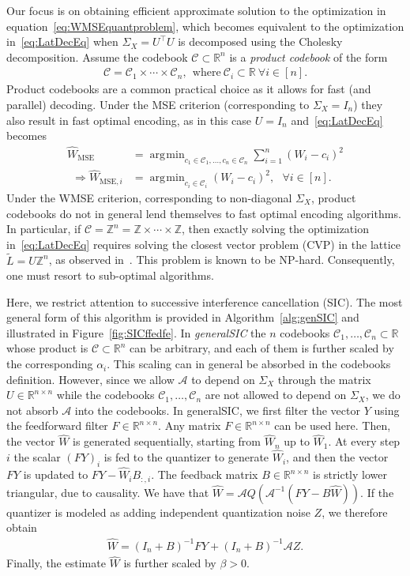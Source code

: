 \documentclass[journal]{IEEEtran}
\newcommand{\ZZ}{\mathbb{Z}}
\newcommand{\RR}{\mathbb{R}}
\newcommand{\m}{\mathcal}
\DeclareMathOperator*{\argmin}{\arg\!\min}
\begin{document}
Our focus is on obtaining efficient approximate solution to the optimization in equation~\eqref{eq:WMSEquantproblem}, which becomes equivalent to the optimization in~\eqref{eq:LatDecEq} when $\Sigma_X=U^\top U$ is decomposed using the Cholesky decomposition. Assume the codebook $\m{C}\subset\RR^n$ is a \emph{product codebook} of the form 
\begin{align}
\m{C}=\m{C}_1\times\cdots\times\m{C}_n,~~\text{where}~\m{C}_i\subset\RR~ \forall i\in[n].
\end{align}
Product codebooks are a common practical choice as it allows for fast (and parallel) decoding. Under the MSE criterion (corresponding to $\Sigma_X=I_n$) they also result in fast optimal encoding, as in this case $U=I_n$ and~\eqref{eq:LatDecEq} becomes
\begin{align}
\hat{W}_{\text{MSE}}&=\argmin_{c_1\in\m{C}_1,\ldots,c_n\in\m{C}_n} \sum_{i=1}^n (W_i-c_i)^2\nonumber\\
~~\Longrightarrow \hat{W}_{\text{MSE},i}&=\argmin_{c_i\in\m{C}_i}(W_i-c_i)^2,~~~\forall i\in[n].   
\end{align}
Under the WMSE criterion, corresponding to non-diagonal $\Sigma_X$, product codebooks do not in general lend
themselves to fast optimal encoding algorithms. In particular, if
$\m{C}=\ZZ^n=\ZZ\times\cdots\times\ZZ$, then exactly solving the optimization
in~\eqref{eq:LatDecEq} requires solving the closest vector problem (CVP) in the lattice
$\tilde{L}=U\ZZ^n$, as observed in~\cite{chen2025geometry,birnick2025lattice}. This problem is
known to be NP-hard. Consequently, one must resort to sub-optimal algorithms. 


Here, we restrict attention to successive
interference cancellation (SIC). The most general form of this algorithm is provided in Algorithm~\ref{alg:genSIC} and illustrated in Figure~\ref{fig:SICffedfe}. In \emph{generalSIC} the $n$ codebooks $\m{C}_1,\ldots,\m{C}_n\subset \RR$ whose product is $\m{C}\subset\RR^n$ can be arbitrary, and each of them is further scaled by the corresponding $\alpha_i$. This scaling can in general be absorbed in the codebooks definition. However, since we allow $\m{A}$ to depend on $\Sigma_X$ through the matrix $U\in\RR^{n\times n}$ while the codebooks $\m{C}_1,\ldots,\m{C}_n$ are not allowed to depend on $\Sigma_X$, we do not absorb $\m{A}$ into the codebooks.
In generalSIC, we first filter the vector $Y$ using the feedforward filter $F\in\RR^{n \times n}$. Any matrix $F\in\RR^{n\times n}$ can be used here. Then, the vector $\hat{W}$ is generated sequentially, starting from $\hat{W}_n$ up to $\hat{W}_1$. At every step $i$ the scalar $(FY)_i$ is fed to the quantizer to generate $\hat{W}_i$, and then the vector $FY$ is updated to $FY-\hat{W}_i B_{:,i}$. The feedback matrix $B\in\RR^{n\times n}$ is strictly lower triangular, due to causality.
We have that $\hat{W}=\m{A} Q\left(\m{A}^{-1}(FY-B\hat{W}) \right)$. If the quantizer is modeled as adding independent quantization noise $Z$, we therefore obtain \begin{align}
\hat{W}=(I_n+B)^{-1}FY+(I_n+B)^{-1}\m{A}Z.   
\end{align}
Finally, the estimate $\hat{W}$ is further scaled by $\beta>0$.
\end{document}
